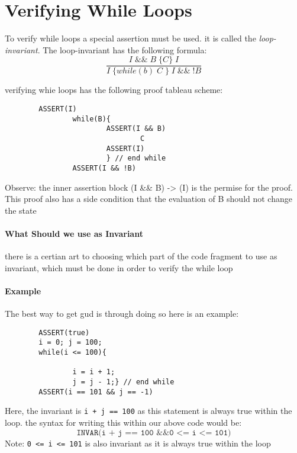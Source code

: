 \documentclass[12pt]{book}
\begin{document}
\section*{Verifying While Loops}
To verify while loops a special assertion must be used. it is called the \textit{loop-invariant}. The loop-invariant has the 
following formula:
\[\frac{I\;\&\&\;B\;\{C\}\;I}{I\;\{while(b)\;C\;\}\;I\;\&\&\;!B}\]

verifying whie loops has the following proof tableau scheme:
\begin{verbatim}
        ASSERT(I)
                while(B){
                        ASSERT(I && B)
                                C
                        ASSERT(I)
                        } // end while
                ASSERT(I && !B)
\end{verbatim}

Observe: the inner assertion block (I \&\& B) -> (I) is the permise for the proof.
This proof also has a side condition that the evaluation of B should not change the state

\paragraph{What Should we use as Invariant}
there is a certian art to choosing which part of the code fragment to use as invariant, which must be done in order to verify the while loop

\paragraph{Example}
The best way to get gud is through doing so here is an example:
\begin{verbatim}
        ASSERT(true)
        i = 0; j = 100;
        while(i <= 100){

                i = i + 1;
                j = j - 1;} // end while
        ASSERT(i == 101 && j == -1)
\end{verbatim}

Here, the invariant is \texttt{i + j == 100} as this statement is always true within the loop.
the syntax for writing this within our above code would be:
\[\texttt{INVAR(i + j == 100 \&\& 0 <= i <= 101)}\]
Note: \texttt{0 <= i <= 101} is also invariant as it is always true within the loop
\end{document}

